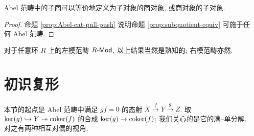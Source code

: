 \begin{corollary}\label{prop:Abel-cat-subquotient}
	Abel 范畴中的子商可以等价地定义为子对象的商对象, 或商对象的子对象.
\end{corollary}
\begin{proof}
	命题 \ref{prop:Abel-cat-pull-push} 说明命题 \ref{prop:subquotient-equiv} 可施于任何 Abel 范畴.
\end{proof}

对于任意环 $R$ 上的左模范畴 $R\text{-}\mathsf{Mod}$, 以上结果当然是熟知的; 右模范畴亦然.

\section{初识复形}\label{sec:cohomology}
本节的起点是 Abel 范畴中满足 $gf = 0$ 的态射 $X \xrightarrow{f} Y \xrightarrow{g} Z$. 取 $\operatorname{ker}(g) \hookrightarrow Y \twoheadrightarrow \operatorname{coker}(f)$ 的合成 $\operatorname{ker}(g) \to \operatorname{coker}(f)$; 我们关心的是它的满--单分解. 对之有两种相互对偶的视角.

